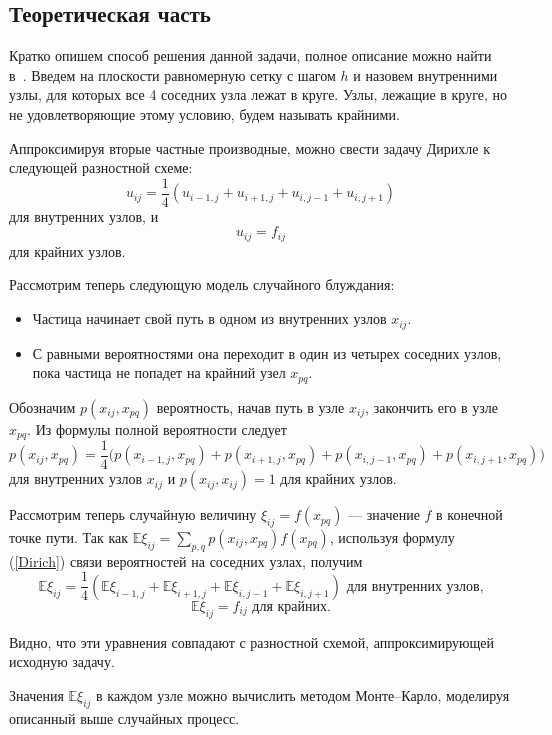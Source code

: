 \documentclass[12pt, a4paper]{article} %
\begin{document}
\subsection{Теоретическая часть}
Кратко опишем способ решения данной задачи, полное описание можно найти в~\cite{Buslenko}.
Введем на плоскости равномерную сетку с шагом $h$ и назовем внутренними узлы, для которых все 4 соседних узла лежат в круге. 
Узлы, лежащие в круге, но не удовлетворяющие этому условию, будем называть крайними. 

Аппроксимируя вторые частные производные, можно свести задачу Дирихле к следующей разностной схеме:
$$u_{ij} = \dfrac14(u_{i-1,j} + u_{i+1, j} + u_{i, j-1} + u_{i,j+1})$$
для внутренних узлов, и
$$u_{ij} = f_{ij}$$
для крайних узлов.

Рассмотрим теперь следующую модель случайного блуждания: 
\begin{itemize}
	\item Частица начинает свой путь в одном из внутренних узлов $x_{ij}$.
	\item С равными вероятностями она переходит в один из четырех соседних узлов, пока частица не попадет на крайний узел $x_{pq}$.
\end{itemize}


Обозначим $p(x_{ij}, x_{pq})$ вероятность, начав путь в узле $x_{ij}$, закончить его в узле $x_{pq}$. Из формулы полной вероятности следует
\begin{equation}\label{Dirich}
p(x_{ij}, x_{pq}) = \dfrac14\bigl(p(x_{i-1,j}, x_{pq}) + p(x_{i+1, j}, x_{pq}) + p(x_{i, j-1}, x_{pq}) + p(x_{i,j+1}, x_{pq})\bigr)
\end{equation}
для внутренних узлов $x_{ij}$ и $p(x_{ij}, x_{ij}) = 1$ для крайних узлов.

Рассмотрим теперь случайную величину $\xi_{ij} = f(x_{pq})$ --- значение $f$ в конечной точке пути.
Так как $\mathbb{E}\xi_{ij} = \sum_{p, q}p(x_{ij}, x_{pq})f(x_{pq})$, используя формулу (\ref{Dirich}) связи вероятностей на соседних узлах, получим
$$\mathbb{E}\xi_{ij} = \dfrac14(\mathbb{E}\xi_{i-1,j} + \mathbb{E}\xi_{i+1, j} + \mathbb{E}\xi_{i, j-1} + \mathbb{E}\xi_{i,j+1}) \text{ для внутренних узлов,}$$
$$\mathbb{E}\xi_{ij} = f_{ij} \text{ для крайних}.$$

Видно, что эти уравнения совпадают с разностной схемой, аппроксимирующей исходную задачу.

Значения $\mathbb{E}\xi_{ij}$ в каждом узле можно вычислить методом Монте--Карло, моделируя описанный выше случайных процесс. 
\end{document}
